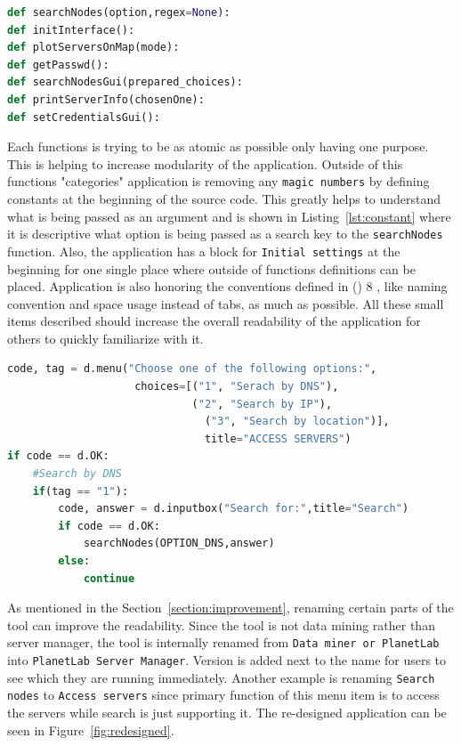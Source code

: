 \begin{minipage}{\linewidth}
\begin{lstlisting}[language=Python, numbers=none, label={lst:descriptive}, caption=Example of Function Names, frame=single, showstringspaces=false, breaklines=true]
def searchNodes(option,regex=None):
def initInterface():
def plotServersOnMap(mode):
def getPasswd():
def searchNodesGui(prepared_choices):
def printServerInfo(chosenOne):
def setCredentialsGui():
\end{lstlisting}
\end{minipage}

Each functions is trying to be as atomic as possible only having one purpose. This is helping to increase modularity of the application. Outside of this functions "categories" application is removing any \texttt{magic numbers} by defining constants at the beginning of the source code. This greatly helps to understand what is being passed as an argument and is shown in Listing~\ref{lst:constant} where it is descriptive what option is being passed as a search key to the \texttt{searchNodes} function. Also, the application has a block for \texttt{Initial settings} at the beginning for one single place where outside of functions definitions can be placed. Application is also honoring the conventions defined in  () 8 \cite{pythonpep}, like naming convention and space usage instead of tabs, as much as possible. All these small items described should increase the overall readability of the application for others to quickly familiarize with it.

\begin{minipage}{\linewidth}
\begin{lstlisting}[language=Python, numbers=none, label={lst:constant}, caption=Example of Constant Usage, frame=single, showstringspaces=false, breaklines=true]
code, tag = d.menu("Choose one of the following options:",
					choices=[("1", "Serach by DNS"),
				      		 ("2", "Search by IP"),
					    	   ("3", "Search by location")],
						       title="ACCESS SERVERS")
if code == d.OK:
	#Search by DNS
	if(tag == "1"):
		code, answer = d.inputbox("Search for:",title="Search")
		if code == d.OK:
			searchNodes(OPTION_DNS,answer)
		else:
			continue
\end{lstlisting}
\end{minipage}

As mentioned in the Section~\ref{section:improvement}, renaming certain parts of the tool can improve the readability. Since the tool is not data mining rather than server manager, the tool is internally renamed from \texttt{Data miner or PlanetLab} into \texttt{PlanetLab Server Manager}. Version is added next to the name for users to see which they are running immediately. Another example is renaming \texttt{Search nodes} to \texttt{Access servers} since primary function of this menu item is to access the servers while search is just supporting it. The re-designed application can be seen in Figure~\ref{fig:redesigned}.\\

